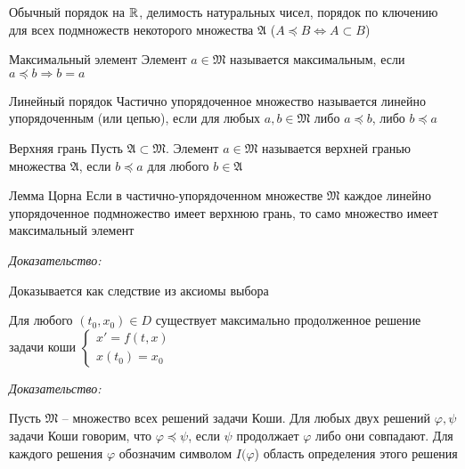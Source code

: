 \documentclass[12pt]{article}
\begin{document}
\begin{Example}{}
    Обычный порядок на $\mathbb R$, делимость натуральных чисел, порядок по ключению для всех подмножеств некоторого множества $\mathfrak{A}$ ($A \preccurlyeq B \Leftrightarrow A \subset B$)
\end{Example}

\begin{defin}{Максимальный элемент}
    Элемент $a \in \mathfrak{M}$ называется максимальным, если $a \preccurlyeq b \Rightarrow b = a$
\end{defin}

\begin{defin}{Линейный порядок}
    Частично упорядоченное множество называется линейно упорядоченным (или цепью), если для любых $a, b \in \mathfrak{M}$ либо $a \preccurlyeq b$, либо $b \preccurlyeq a$
\end{defin}

\begin{defin}{Верхняя грань}
    Пусть $\mathfrak{A} \subset \mathfrak{M}$. Элемент $a \in \mathfrak{M}$ называется верхней гранью множества $\mathfrak{A}$, если $b \preccurlyeq a$ для любого $b \in \mathfrak{A}$
\end{defin}

\begin{lem}{Лемма Цорна}
    Если в частично-упорядоченном множестве $\mathfrak{M}$ каждое линейно упорядоченное подмножество имеет верхнюю грань, то само множество имеет максимальный элемент 
\end{lem}

\textit{Доказательство:}

Доказывается как следствие из аксиомы выбора 

\begin{theo}{}
    Для любого $(t_0, x_0) \in D$ существует максимально продолженное решение задачи коши $\begin{cases}
        x' = f(t, x) \\
        x(t_0) = x_0
    \end{cases}$
\end{theo}

\textit{Доказательство:}

Пусть $\mathfrak{M}$ -- множество всех решений задачи Коши. Для любых двух решений $\varphi, \psi$ задачи Коши говорим, что $\varphi \preccurlyeq \psi$, если $\psi$ продолжает $\varphi$ либо они совпадают. Для каждого решения $\varphi$ обозначим символом $I(\varphi$) область определения этого решения 
\end{document}
